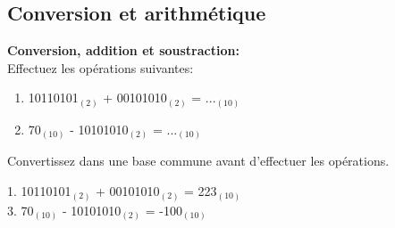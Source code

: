 \subsection{Conversion et arithmétique}
\begin{Exercice}[5 minutes] \textbf{Conversion, addition et soustraction:}\\
    Effectuez les opérations suivantes:
    \begin{enumerate}
        \item 10110101$_{(2)}$ + 00101010$_{(2)}$ = ...$_{(10)}$
        \item 70$_{(10)}$ - 10101010$_{(2)}$ = ...$_{(10)}$
    \end{enumerate}
        \begin{conseil}
        Convertissez dans une base commune avant d'effectuer les opérations.
    \end{conseil}
        
    \begin{solution}
        1. 10110101$_{(2)}$ + 00101010$_{(2)}$ = 223$_{(10)}$\\
        3. 70$_{(10)}$ - 10101010$_{(2)}$ = -100$_{(10)}$
    \end{solution}
\end{Exercice}


